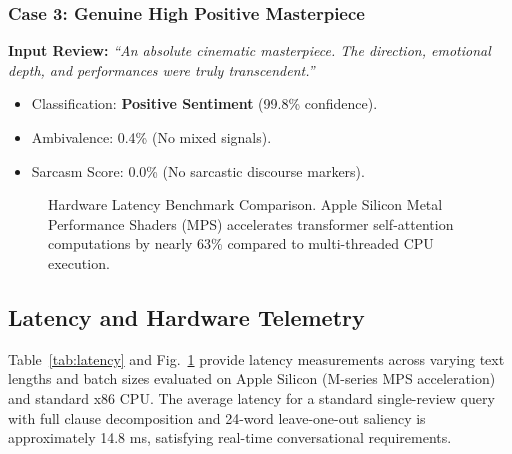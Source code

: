 \documentclass[conference]{IEEEtran}
\begin{document}
\subsubsection{Case 3: Genuine High Positive Masterpiece}
\textbf{Input Review:} \textit{``An absolute cinematic masterpiece. The direction, emotional depth, and performances were truly transcendent.''}
\begin{itemize}
    \item Classification: \textbf{Positive Sentiment} (99.8\% confidence).
    \item Ambivalence: 0.4\% (No mixed signals).
    \item Sarcasm Score: 0.0\% (No sarcastic discourse markers).
\end{itemize}

\begin{figure}[t]
\centering
{}
\caption{Hardware Latency Benchmark Comparison. Apple Silicon Metal Performance Shaders (MPS) accelerates transformer self-attention computations by nearly 63\% compared to multi-threaded CPU execution.}
\label{fig:latency_chart}
\end{figure}

\subsection{Latency and Hardware Telemetry}
Table~\ref{tab:latency} and Fig.~\ref{fig:latency_chart} provide latency measurements across varying text lengths and batch sizes evaluated on Apple Silicon (M-series MPS acceleration) and standard x86 CPU. The average latency for a standard single-review query with full clause decomposition and 24-word leave-one-out saliency is approximately 14.8 ms, satisfying real-time conversational requirements.
\end{document}
